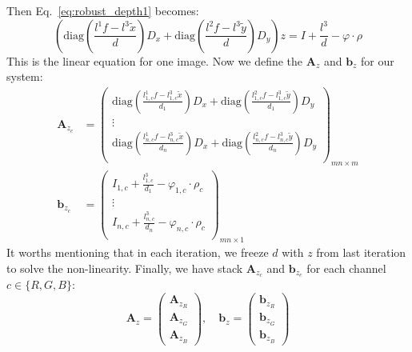 Then Eq.~\ref{eq:robust_depth1} becomes:
\begin{equation}\label{eq:robust_depth2}
        \left(\text{diag}(\frac{l^1f - l^3\tilde{x}}{d}) D_x + \text{diag}(\frac{l^2f - l^3\tilde{y}}{d}) D_y\right) z = I + \frac{l^3}{d} - \varphi \cdot \rho
\end{equation}
This is the linear equation for one image. 
Now we define the $\mathbf{A}_z$ and $\mathbf{b}_z$ for our system:
\begin{equation}\label{eq:robust_depth3}
\begin{split}
    \mathbf{A}_{z_c} &= 
        \begin{pmatrix}    
            \text{diag}(\frac{l^1_{1,c}f - l^3_{1,c}\tilde{x}}{d_1}) D_x + \text{diag}(\frac{l^2_{1,c}f - l^3_{1,c}\tilde{y}}{d_1}) D_y \\
            \vdots \\
            \text{diag}(\frac{l^1_{n,c}f - l^3_{n,c}\tilde{x}}{d_n}) D_x + \text{diag}(\frac{l^2_{n,c}f - l^3_{n,c}\tilde{y}}{d_n}) D_y \\
        \end{pmatrix}_{mn \times m}
\\
    \mathbf{b}_{z_c} &=     
        \begin{pmatrix}    
            I_{1,c} + \frac{l^3_{1,c}}{d_{1}} - \varphi_{1,c} \cdot \rho_{c} \\
            \vdots\\
            I_{n,c} + \frac{l^3_{n,c}}{d_{n}} - \varphi_{n,c} \cdot \rho_{c} \\
        \end{pmatrix}_{mn \times 1}    
\end{split}
\end{equation}
 It worths mentioning that in each iteration, we freeze $d$ with $z$ from last iteration to solve the non-linearity.
 Finally, we have stack $\mathbf{A}_{z_c}$ and $\mathbf{b}_{z_c}$ for each channel $c\in\{R,G,B\}$:
 \begin{equation}
     \mathbf{A}_z = 
         \begin{pmatrix}
             \mathbf{A}_{z_R}\\
             \mathbf{A}_{z_G}\\
             \mathbf{A}_{z_B}
         \end{pmatrix},\quad
     \mathbf{b}_z = 
         \begin{pmatrix}
             \mathbf{b}_{z_R}\\
             \mathbf{b}_{z_G}\\
             \mathbf{b}_{z_B}
         \end{pmatrix}         
 \end{equation}
